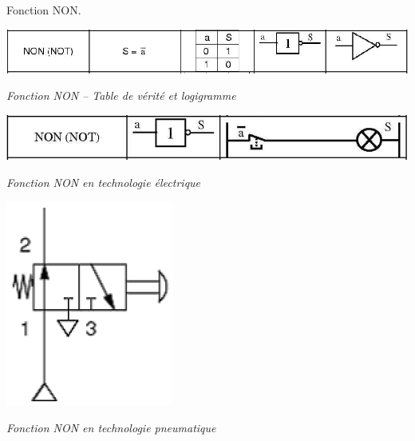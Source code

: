 \documentclass[11pt,oneside]{article}
\begin{document}
\begin{exemple}
Fonction NON.

\begin{minipage}[c]{.3\linewidth}
\begin{center}
\includegraphics[width=.9\textwidth]{png/non_logi}

\textit{Fonction NON -- Table de vérité et logigramme}
\end{center}
\end{minipage} \hfill
\begin{minipage}[c]{.3\linewidth}
\begin{center}
\includegraphics[width=.9\textwidth]{png/non_elec}

\textit{Fonction NON en technologie électrique}
\end{center}
\end{minipage} \hfill
\begin{minipage}[c]{.3\linewidth}
\begin{center}
\includegraphics[width=.9\textwidth]{png/non_pneu}

\textit{Fonction NON en technologie pneumatique}
\end{center}
\end{minipage}
\end{exemple}
\end{document}
